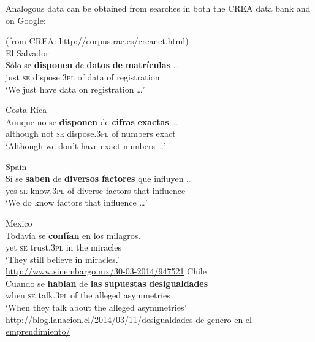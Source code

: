 \documentclass[output=paper]{langsci/langscibook}
\begin{document}
Analogous data can be obtained from searches in both the CREA data bank and on Google:



\ea%
    (from CREA: http://corpus.rae.es/creanet.html)\label{ex:gallego:28}\\
    \ea  El Salvador\\
    \gll Sólo se  \textbf{disponen}     de  \textbf{datos} \textbf{de}  \textbf{matrículas} …     \\
         just  \textsc{se}   dispose{}.\textsc{3pl} of  data    of  registration\\
    \glt ‘We just have data on registration …’
    \noindent\parbox{\textwidth}{\ex  Costa Rica\\
    \gll Aunque   no   se \textbf{disponen}      de  \textbf{cifras}       \textbf{exactas} …  \\
         although not \textsc{se}   dispose{}.\textsc{3pl}  of   numbers  exact\\
    \glt ‘Although we don’t have exact numbers …’}
    \ex  Spain\\
    \gll   Sí   se  \textbf{saben}        de \textbf{diversos} \textbf{factores} que influyen …  \\
           yes \textsc{se}   know{}.\textsc{3pl}  of  diverse   factors    that influence\\
    \glt   ‘We do know factors that influence …’
    \z
\z    


\ea%
    \label{ex:gallego:29}
    \ea  Mexico\\
    \gll Todavía se   \textbf{confían}    en  los   milagros.\\
         yet         \textsc{se}   trust{}.\textsc{3pl}  in  the   miracles\\
    \glt ‘They still believe in miracles.’\\
    {\small\url{http://www.sinembargo.mx/30-03-2014/947521}}
    \ex  Chile\\
    \gll Cuando se   \textbf{hablan}    de  \textbf{las} \textbf{supuestas} \textbf{desigualdades} \\
         when     \textsc{se}   talk{}.\textsc{3pl}   of  the alleged      asymmetries\\
    \glt ‘When they talk about the alleged asymmetries’\\
    {\small\url{http://blog.lanacion.cl/2014/03/11/desigualdades-de-genero-en-el-emprendimiento/}}
    \z
\z    
\end{document}
